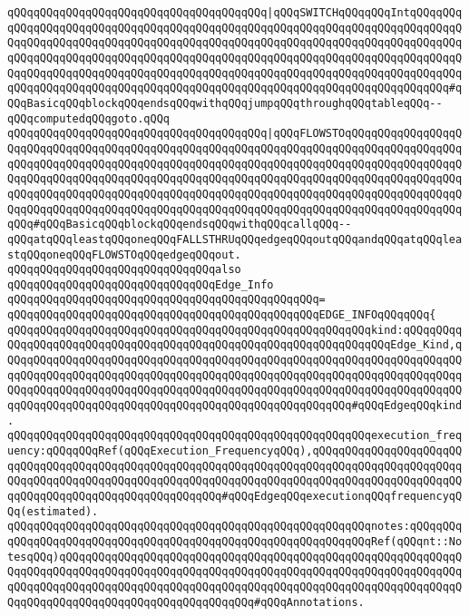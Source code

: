 \verb|qQQqqQQqqQQqqQQqqQQqqQQqqQQqqQQqqQQqqQQq|\verb#|qQQqSWITCHqQQqqQQqIntqQQqqQQqqQQqqQQqqQQqqQQqqQQqqQQqqQQqqQQqqQQqqQQqqQQqqQQqqQQqqQQqqQQqqQQqqQQqqQQqqQQqqQQqqQQqqQQqqQQqqQQqqQQqqQQqqQQqqQQqqQQqqQQqqQQqqQQqqQQqqQQqqQQqqQQqqQQqqQQqqQQqqQQqqQQqqQQqqQQqqQQqqQQqqQQqqQQqqQQqqQQqqQQqqQQqqQQqqQQqqQQqqQQqqQQqqQQqqQQqqQQqqQQqqQQqqQQqqQQqqQQqqQQqqQQqqQQqqQQqqQQqqQQqqQQqqQQqqQQqqQQqqQQqqQQqqQQqqQQqqQQqqQQqqQQqqQQqqQQqqQQqqQQqqQQqqQQq#\verb|#qQQqBasicqQQqblockqQQqendsqQQqwithqQQqjumpqQQqthroughqQQqtableqQQq--qQQqcomputedqQQqgoto.qQQq|\newline
\verb|qQQqqQQqqQQqqQQqqQQqqQQqqQQqqQQqqQQqqQQq|\verb#|qQQqFLOWSTOqQQqqQQqqQQqqQQqqQQqqQQqqQQqqQQqqQQqqQQqqQQqqQQqqQQqqQQqqQQqqQQqqQQqqQQqqQQqqQQqqQQqqQQqqQQqqQQqqQQqqQQqqQQqqQQqqQQqqQQqqQQqqQQqqQQqqQQqqQQqqQQqqQQqqQQqqQQqqQQqqQQqqQQqqQQqqQQqqQQqqQQqqQQqqQQqqQQqqQQqqQQqqQQqqQQqqQQqqQQqqQQqqQQqqQQqqQQqqQQqqQQqqQQqqQQqqQQqqQQqqQQqqQQqqQQqqQQqqQQqqQQqqQQqqQQqqQQqqQQqqQQqqQQqqQQqqQQqqQQqqQQqqQQqqQQqqQQqqQQqqQQqqQQqqQQqqQQqqQQqqQQqqQQqqQQq#\verb|#qQQqBasicqQQqblockqQQqendsqQQqwithqQQqcallqQQq--qQQqatqQQqleastqQQqoneqQQqFALLSTHRUqQQqedgeqQQqoutqQQqandqQQqatqQQqleastqQQqoneqQQqFLOWSTOqQQqedgeqQQqout.|\newline
\newline
\verb|qQQqqQQqqQQqqQQqqQQqqQQqqQQqqQQqalso|\newline
\verb|qQQqqQQqqQQqqQQqqQQqqQQqqQQqqQQqEdge_Info|\newline
\verb|qQQqqQQqqQQqqQQqqQQqqQQqqQQqqQQqqQQqqQQqqQQqqQQq=|\newline
\verb|qQQqqQQqqQQqqQQqqQQqqQQqqQQqqQQqqQQqqQQqqQQqqQQqEDGE_INFOqQQqqQQq{|\newline
\verb|qQQqqQQqqQQqqQQqqQQqqQQqqQQqqQQqqQQqqQQqqQQqqQQqqQQqqQQqkind:qQQqqQQqqQQqqQQqqQQqqQQqqQQqqQQqqQQqqQQqqQQqqQQqqQQqqQQqqQQqqQQqqQQqEdge_Kind,qQQqqQQqqQQqqQQqqQQqqQQqqQQqqQQqqQQqqQQqqQQqqQQqqQQqqQQqqQQqqQQqqQQqqQQqqQQqqQQqqQQqqQQqqQQqqQQqqQQqqQQqqQQqqQQqqQQqqQQqqQQqqQQqqQQqqQQqqQQqqQQqqQQqqQQqqQQqqQQqqQQqqQQqqQQqqQQqqQQqqQQqqQQqqQQqqQQqqQQqqQQqqQQqqQQqqQQqqQQqqQQqqQQqqQQqqQQqqQQqqQQqqQQqqQQqqQQqqQQqqQQq#qQQqEdgeqQQqkind.|\newline
\verb|qQQqqQQqqQQqqQQqqQQqqQQqqQQqqQQqqQQqqQQqqQQqqQQqqQQqqQQqexecution_frequency:qQQqqQQqRef(qQQqExecution_FrequencyqQQq),qQQqqQQqqQQqqQQqqQQqqQQqqQQqqQQqqQQqqQQqqQQqqQQqqQQqqQQqqQQqqQQqqQQqqQQqqQQqqQQqqQQqqQQqqQQqqQQqqQQqqQQqqQQqqQQqqQQqqQQqqQQqqQQqqQQqqQQqqQQqqQQqqQQqqQQqqQQqqQQqqQQqqQQqqQQqqQQqqQQqqQQqqQQqqQQqqQQq#qQQqEdgeqQQqexecutionqQQqfrequencyqQQq(estimated).|\newline
\verb|qQQqqQQqqQQqqQQqqQQqqQQqqQQqqQQqqQQqqQQqqQQqqQQqqQQqqQQqnotes:qQQqqQQqqQQqqQQqqQQqqQQqqQQqqQQqqQQqqQQqqQQqqQQqqQQqqQQqqQQqqQQqRef(qQQqnt::NotesqQQq)qQQqqQQqqQQqqQQqqQQqqQQqqQQqqQQqqQQqqQQqqQQqqQQqqQQqqQQqqQQqqQQqqQQqqQQqqQQqqQQqqQQqqQQqqQQqqQQqqQQqqQQqqQQqqQQqqQQqqQQqqQQqqQQqqQQqqQQqqQQqqQQqqQQqqQQqqQQqqQQqqQQqqQQqqQQqqQQqqQQqqQQqqQQqqQQqqQQqqQQqqQQqqQQqqQQqqQQqqQQqqQQqqQQqqQQqqQQqqQQq#qQQqAnnotations.|\newline

